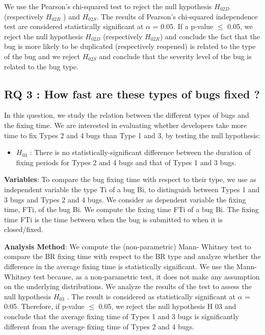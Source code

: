 We use the Pearson's chi-squared test to reject the null hypothesis
\(H_{02D}\) (respectively \(H_{02R}\) ) and \(H_{02S}\). The results of
Pearson's chi-squared independence test are considered statistically
significant at \(\alpha\) = 0.05. If a p-value \(\le\) 0.05, we reject
the null hypothesis \(H_{02D}\) (respectively \(H_{02R}\)) and conclude
the fact that the bug is more likely to be duplicated (respectively
reopened) is related to the type of the bug and we reject \(H_{02S}\)
and conclude that the severity level of the bug is related to the bug
type.

\subsection{RQ 3 : How fast are these types of bugs fixed
?}\label{rq-3-how-fast-are-these-types-of-bugs-fixed}

In this question, we study the relation between the different types of
bugs and the fixing time. We are interested in evaluating whether
developers take more time to fix Types 2 and 4 bugs than Type 1 and 3,
by testing the null hypothesis:

\begin{itemize}
\tightlist
\item
  \(H_{03}\) : There is no statistically-significant difference between
  the duration of fixing periods for Types 2 and 4 bugs and that of
  Types 1 and 3 bugs.
\end{itemize}

{\textbf{Variables}}: To compare the bug fixing time with respect to
their type, we use as independent variable the type Ti of a bug Bi, to
distinguish between Types 1 and 3 bugs and Types 2 and 4 bugs. We
consider as dependent variable the fixing time, FTi, of the bug Bi. We
compute the fixing time FTi of a bug Bi. The fixing time FTi is the time
between when the bug is submitted to when it is closed/fixed.

{\textbf{Analysis Method}}: We compute the (non-parametric) Mann-
Whitney test to compare the BR fixing time with respect to the BR type
and analyze whether the difference in the average fixing time is
statistically significant. We use the Mann- Whitney test because, as a
non-parametric test, it does not make any assumption on the underlying
distributions. We analyze the results of the test to assess the null
hypothesis \(H_{03}\) . The result is considered as statistically
significant at \(\alpha\) = 0.05. Therefore, if p-value \(\le\) 0.05, we
reject the null hypothesis H 03 and conclude that the average fixing
time of Types 1 and 3 bugs is significantly different from the average
fixing time of Types 2 and 4 bugs.

